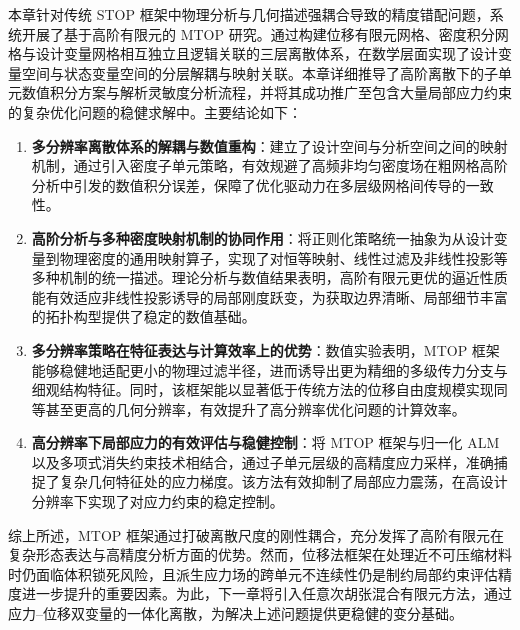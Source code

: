 本章针对传统 STOP 框架中物理分析与几何描述强耦合导致的精度错配问题，系统开展了基于高阶有限元的 MTOP 研究。通过构建位移有限元网格、密度积分网格与设计变量网格相互独立且逻辑关联的三层离散体系，在数学层面实现了设计变量空间与状态变量空间的分层解耦与映射关联。本章详细推导了高阶离散下的子单元数值积分方案与解析灵敏度分析流程，并将其成功推广至包含大量局部应力约束的复杂优化问题的稳健求解中。主要结论如下：
\begin{enumerate}[
	label={（\arabic*）},
	labelsep=0.25em,
	leftmargin=3.2em,
	itemsep=0.4em,
	topsep=0.4em,
	parsep=0pt,
	partopsep=0pt
	]
	\item \textbf{多分辨率离散体系的解耦与数值重构}：建立了设计空间与分析空间之间的映射机制，通过引入密度子单元策略，有效规避了高频非均匀密度场在粗网格高阶分析中引发的数值积分误差，保障了优化驱动力在多层级网格间传导的一致性。
	
	\item \textbf{高阶分析与多种密度映射机制的协同作用}：将正则化策略统一抽象为从设计变量到物理密度的通用映射算子，实现了对恒等映射、线性过滤及非线性投影等多种机制的统一描述。理论分析与数值结果表明，高阶有限元更优的逼近性质能有效适应非线性投影诱导的局部刚度跃变，为获取边界清晰、局部细节丰富的拓扑构型提供了稳定的数值基础。
	
	\item \textbf{多分辨率策略在特征表达与计算效率上的优势}：数值实验表明，MTOP 框架能够稳健地适配更小的物理过滤半径，进而诱导出更为精细的多级传力分支与细观结构特征。同时，该框架能以显著低于传统方法的位移自由度规模实现同等甚至更高的几何分辨率，有效提升了高分辨率优化问题的计算效率。
	
	\item \textbf{高分辨率下局部应力的有效评估与稳健控制}：将 MTOP 框架与归一化 ALM 以及多项式消失约束技术相结合，通过子单元层级的高精度应力采样，准确捕捉了复杂几何特征处的应力梯度。该方法有效抑制了局部应力震荡，在高设计分辨率下实现了对应力约束的稳定控制。
\end{enumerate}

综上所述，MTOP 框架通过打破离散尺度的刚性耦合，充分发挥了高阶有限元在复杂形态表达与高精度分析方面的优势。然而，位移法框架在处理近不可压缩材料时仍面临体积锁死风险，且派生应力场的跨单元不连续性仍是制约局部约束评估精度进一步提升的重要因素。为此，下一章将引入任意次胡张混合有限元方法，通过应力--位移双变量的一体化离散，为解决上述问题提供更稳健的变分基础。


